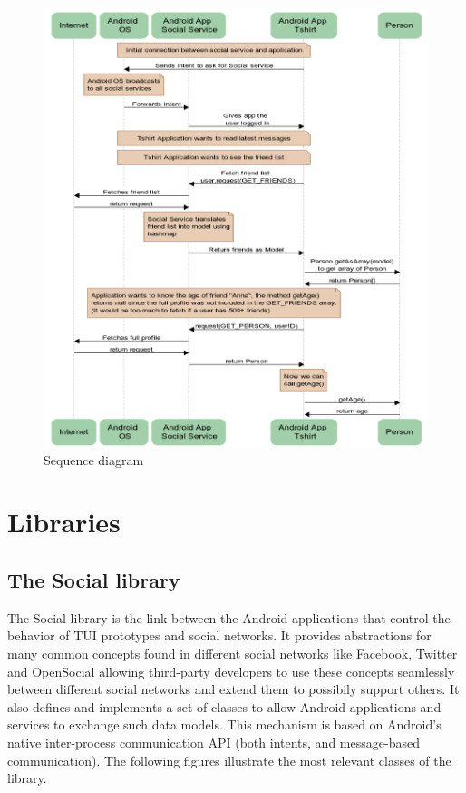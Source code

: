 \begin{figure}[h!]
	\centering \includegraphics[width=1.0\textwidth]{img/design-sequence.png}
	\caption{Sequence diagram}
	\label{fig:design-sequence}
\end{figure}


\section{Libraries}

\subsection{The Social library}
The Social library is the link between the Android applications that control the
behavior of TUI prototypes and social networks. It provides abstractions for
many common concepts found in different social networks like Facebook, Twitter
and OpenSocial allowing third-party developers to use these concepts seamlessly
between different social networks and extend them to possibily support others.
It also defines and implements a set of classes to allow Android applications
and services to exchange such data models. This mechanism is based on Android's
native inter-process communication API (both intents, and message-based \newline
communication). The following figures illustrate the most relevant classes
of the library.

